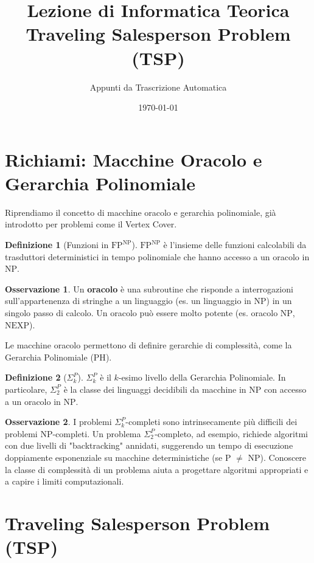 \documentclass[a4paper]{article}
\title{Lezione di Informatica Teorica\\{\Large Traveling Salesperson Problem (TSP)}}
\author{Appunti da Trascrizione Automatica}
\date{\today}
\theoremstyle{definition} %
\newtheorem{definition}{Definizione}
\newtheorem{remark}{Osservazione}
\begin{document}
\maketitle
\tableofcontents
\newpage

\section{Richiami: Macchine Oracolo e Gerarchia Polinomiale}

Riprendiamo il concetto di macchine oracolo e gerarchia polinomiale, già introdotto per problemi come il Vertex Cover.

\begin{definition}[Funzioni in $\text{FP}^{\text{NP}}$]
$\text{FP}^{\text{NP}}$ è l'insieme delle funzioni calcolabili da trasduttori deterministici in tempo polinomiale che hanno accesso a un oracolo in $\text{NP}$.
\end{definition}

\begin{remark}
Un \textbf{oracolo} è una subroutine che risponde a interrogazioni sull'appartenenza di stringhe a un linguaggio (es. un linguaggio in $\text{NP}$) in un singolo passo di calcolo. Un oracolo può essere molto potente (es. oracolo $\text{NP}$, $\text{NEXP}$).
\end{remark}

Le macchine oracolo permettono di definire gerarchie di complessità, come la Gerarchia Polinomiale ($\text{PH}$).
\begin{definition}[$\Sigma_k^P$]
$\Sigma_k^P$ è il $k$-esimo livello della Gerarchia Polinomiale. In particolare, $\Sigma_2^P$ è la classe dei linguaggi decidibili da macchine in $\text{NP}$ con accesso a un oracolo in $\text{NP}$.
\end{definition}

\begin{remark}
I problemi $\Sigma_k^P$-completi sono intrinsecamente più difficili dei problemi $\text{NP}$-completi. Un problema $\Sigma_2^P$-completo, ad esempio, richiede algoritmi con due livelli di "backtracking" annidati, suggerendo un tempo di esecuzione doppiamente esponenziale su macchine deterministiche (se P $\neq$ NP). Conoscere la classe di complessità di un problema aiuta a progettare algoritmi appropriati e a capire i limiti computazionali.
\end{remark}

\section{Traveling Salesperson Problem (TSP)}
\end{document}
